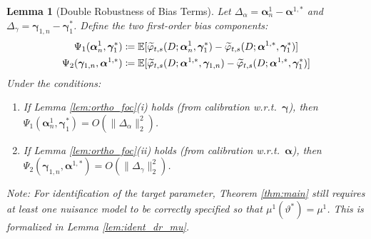 \documentclass{article}
\newtheorem{lemma}[theorem]{Lemma}
\begin{document}
\begin{lemma}[Double Robustness of Bias Terms]\label{lem:dr_terms_revised}
Let $\Delta_\alpha = \boldsymbol{\alpha}_n^1 - \boldsymbol{\alpha}^{1,*}$ and $\Delta_\gamma = \boldsymbol{\gamma}_{1,n} - \boldsymbol{\gamma}_1^*$. Define the two first-order bias components:
\begin{align*}
\Psi_1(\boldsymbol{\alpha}_n^1, \boldsymbol{\gamma}_1^*) &\coloneqq \operatorname{\mathbb{E}}[\widetilde{\varphi}_{t,s}(D; \boldsymbol{\alpha}_n^1, \boldsymbol{\gamma}_1^*) - \widetilde{\varphi}_{t,s}(D; \boldsymbol{\alpha}^{1,*}, \boldsymbol{\gamma}_1^*)] \\
\Psi_2(\boldsymbol{\gamma}_{1,n}, \boldsymbol{\alpha}^{1,*}) &\coloneqq \operatorname{\mathbb{E}}[\widetilde{\varphi}_{t,s}(D; \boldsymbol{\alpha}^{1,*}, \boldsymbol{\gamma}_{1,n}) - \widetilde{\varphi}_{t,s}(D; \boldsymbol{\alpha}^{1,*}, \boldsymbol{\gamma}_1^*)]
\end{align*}
Under the conditions:
\begin{enumerate}
    \item If Lemma \ref{lem:ortho_foc}(i) holds (from calibration w.r.t.\ $\boldsymbol{\gamma}$), then $\Psi_1(\boldsymbol{\alpha}_n^1, \boldsymbol{\gamma}_1^*) = O(\lVert \Delta_\alpha \rVert_2^2)$.
    \item If Lemma \ref{lem:ortho_foc}(ii) holds (from calibration w.r.t.\ $\boldsymbol{\alpha}$), then $\Psi_2(\boldsymbol{\gamma}_{1,n}, \boldsymbol{\alpha}^{1,*}) = O(\lVert \Delta_\gamma \rVert_2^2)$.
\end{enumerate}
Note: For identification of the target parameter, Theorem \ref{thm:main} still requires at least one nuisance model to be correctly specified so that $\mu^1(\vartheta^*)=\mu^1$.
This is formalized in Lemma \ref{lem:ident_dr_mu}.
\end{lemma}
\end{document}
